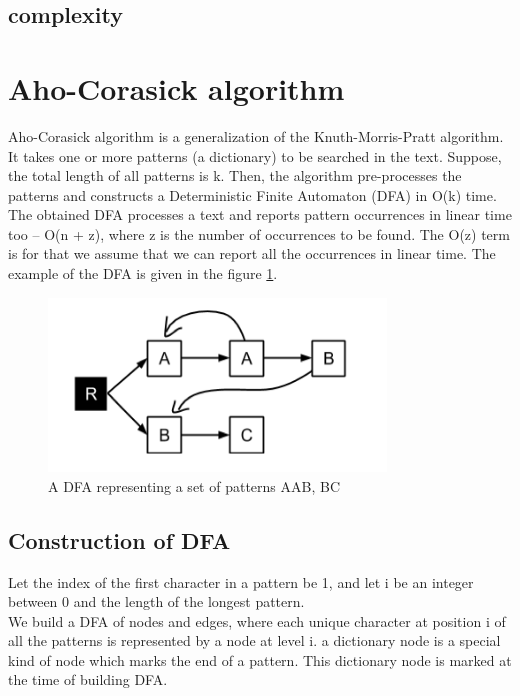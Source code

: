 \documentclass[paper=a4, fontsize=11pt]{scrartcl} %
\numberwithin{equation}{section} %
\numberwithin{figure}{section} %
\numberwithin{table}{section} %
\begin{document}
\subsection{complexity}

\newpage
\section{Aho-Corasick algorithm}
Aho-Corasick algorithm \cite{aho} is a generalization of the Knuth-Morris-Pratt algorithm. It takes one or more patterns (a dictionary) to be searched in the text. Suppose, the total length of all patterns is k. Then, the algorithm pre-processes the patterns and constructs a Deterministic Finite Automaton (DFA) \cite{hopcroft} in O(k) time. The obtained DFA processes a text and reports pattern occurrences in linear time too -- O(n + z), where z is the number of occurrences to be found. The O(z) term is for that we assume that we can report all the occurrences in linear time. The example of the DFA is given in the figure \ref{dfa}.

\begin{figure}[h!]
\centering
\includegraphics[width=0.8\textwidth]{figures/Example_DFA.png}
\caption{A DFA representing a set of patterns {AAB, BC}}
\label{dfa}
\end{figure}

\subsection{Construction of DFA}
Let the index of the first character in a pattern be 1, and let i be an integer between 0 and the length of the longest pattern.
\\
We build a DFA of nodes and edges, where each unique character at position i of all the patterns is represented by a node at level i. a dictionary node is a special kind of node which marks the end of a pattern. This dictionary node is marked at the time of building DFA.
\end{document}
